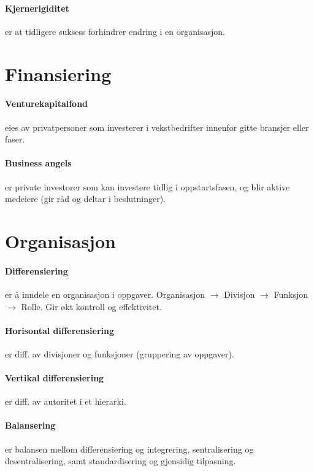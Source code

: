 \documentclass[a4paper]{article}
\begin{document}
\paragraph{Kjernerigiditet} er at tidligere suksess forhindrer endring i en organisasjon.



\section{Finansiering}
\paragraph{Venturekapitalfond} eies av privatpersoner som investerer i vekstbedrifter innenfor gitte bransjer eller faser.
\paragraph{Business angels} er private investorer som kan investere tidlig i oppstartsfasen, og blir aktive medeiere (gir råd og deltar i beslutninger).



\section{Organisasjon}
\paragraph{Differensiering} er å inndele en organisasjon i oppgaver. Organisasjon $\rightarrow$ Divisjon $\rightarrow$ Funksjon $\rightarrow$ Rolle. Gir økt kontroll og effektivitet.
\paragraph{Horisontal differensiering} er diff. av divisjoner og funksjoner (gruppering av oppgaver).
\paragraph{Vertikal differensiering} er diff. av autoritet i et hierarki.
\paragraph{Balansering} er balansen mellom differensiering og integrering, sentralisering og desentralisering, samt standardisering og gjensidig tilpasning.
\end{document}
